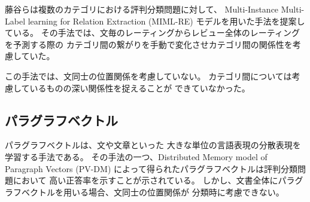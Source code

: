 \documentclass{ttisummary}
\begin{document}
藤谷ら\cite{fujitani15}は複数のカテゴリにおける評判分類問題に対して、
Multi-Instance Multi-Label learning for Relation Extraction (MIML-RE)
\cite{mihai12}モデルを用いた手法を提案している。
その手法では、文毎のレーティングからレビュー全体のレーティングを予測する際の
カテゴリ間の繋がりを手動で変化させカテゴリ間の関係性を考慮していた。

この手法では、文同士の位置関係を考慮していない。
カテゴリ間については考慮しているものの深い関係性を捉えることが
できていなかった。


\subsection{パラグラフベクトル}

パラグラフベクトル\cite{quoc14}は、文や文章といった
大きな単位の言語表現の分散表現を学習する手法である。
その手法の一つ、Distributed Memory model of Paragraph Vectors (PV-DM)
によって得られたパラグラフベクトルは評判分類問題において
高い正答率を示すことが示されている。
しかし、文書全体にパラグラフベクトルを用いる場合、文同士の位置関係が
分類時に考慮できない。
\end{document}

